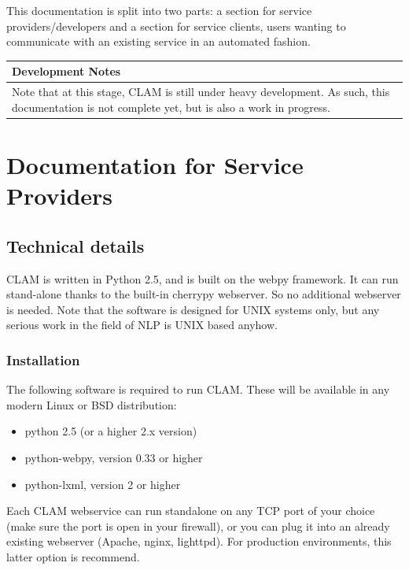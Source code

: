 \documentclass[a4paper,12pt]{report}
\newenvironment{devnotes}
{\newpage
\begin{center}
    \begin{tabular}[h!]{|p{0.8\textwidth}|}
    \hline
    {\bf Development Notes}\\\hline}
{   \\\hline
    \end{tabular}
\end{center}}
\begin{document}
This documentation is split into two parts: a section for service providers/developers and a section for service clients, users wanting to communicate with an existing service in an automated fashion.

\begin{devnotes}
Note that at this stage, CLAM is still under heavy development. As such, this documentation is not complete yet, but is also a work in progress.
\end{devnotes}






\chapter{Documentation for Service Providers}

\section{Technical details}

CLAM is written in Python 2.5, and is built on the webpy framework. It can run stand-alone thanks to the built-in cherrypy webserver. So no additional webserver is needed. Note that the software is designed for UNIX systems only, but any serious work in the field of NLP is UNIX based anyhow. 


\subsection{Installation}

The following software is required to run CLAM. These will be available in any modern Linux or BSD distribution:

\begin{itemize}
\item python 2.5 (or a higher 2.x version)
\item python-webpy, version 0.33 or higher
\item python-lxml, version 2 or higher
\end{itemize}

Each CLAM webservice can run standalone on any TCP port of your choice (make sure the port is open in your firewall), or you can plug it into an already existing webserver (Apache, nginx, lighttpd). For production environments, this latter option is recommend.
\end{document}
